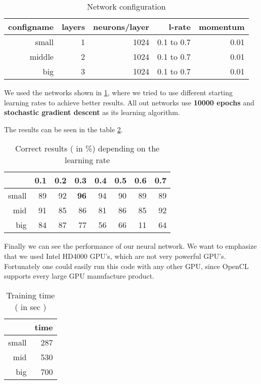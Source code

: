 \documentclass{acm_proc_article-sp}
\begin{document}
\begin{table}[h]
\centering
\caption{Network configuration}
\label{tab:config}
\begin{tabular}{rr|r|r|r}
\hline
configname & layers & neurons/layer& l-rate & momentum\\
\hline
small & 1 & 1024 & 0.1 to 0.7 & 0.01 \\
\hline
middle & 2 & 1024 & 0.1 to 0.7 & 0.01 \\
\hline
big & 3 & 1024 & 0.1 to 0.7 & 0.01\\
\hline
\end{tabular}
\end{table}
We used the networks shown in \ref{tab:config}, where we tried to use different starting learning rates to achieve better results.
All out networks use \textbf{10000 epochs} and \textbf{stochastic gradient descent} as its learning algorithm.


The results can be seen in the table \ref{tab:correct}. 
\begin{table}[h]
\centering
\caption{Correct results ( in \%) depending on the learning rate}
\label{tab:correct}
\begin{tabular}{r|r|r|r|r|r|r|r}
& 0.1 & 0.2 & 0.3 & 0.4 & 0.5 & 0.6 & 0.7 \\
\hline
small & 89 & 92 & \textbf{96} & 94 & 90 & 89 & 89 \\
\hline
mid & 91 &85 & 86 & 81 & 86 & 85 & 92 \\
\hline
big & 84 & 87 & 77 & 56 & 66 & 11 & 64  \\
\end{tabular}
\end{table}

Finally we can see the performance of our neural network. We want to emphasize that we used Intel HD4000 GPU's, which are not very powerful GPU's. Fortunately one could easily run this code with any other GPU, since OpenCL supports every large GPU manufacture product.

\begin{table}[h]
\centering
\caption{Training time ( in sec )}
\label{tab:traintime}
\begin{tabular}{r|r}
& time \\
\hline
small & 287 \\
\hline
mid & 530 \\
\hline
big &  700 \\
\end{tabular}
\end{table}
\end{document}
